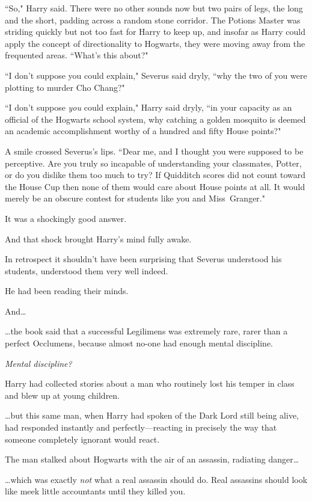 \later

``So," Harry said. There were no other sounds now but two pairs of legs, the long and the short, padding across a random stone corridor. The Potions Master was striding quickly but not too fast for Harry to keep up, and insofar as Harry could apply the concept of directionality to Hogwarts, they were moving away from the frequented areas. ``What's this about?"

``I don't suppose you could explain," Severus said dryly, ``why the two of you were plotting to murder Cho Chang?"

``I don't suppose \emph{you} could explain," Harry said dryly, ``in your capacity as an official of the Hogwarts school system, why catching a golden mosquito is deemed an academic accomplishment worthy of a hundred and fifty House points?"

A smile crossed Severus's lips. ``Dear me, and I thought you were supposed to be perceptive. Are you truly so incapable of understanding your classmates, Potter, or do you dislike them too much to try? If Quidditch scores did not count toward the House Cup then none of them would care about House points at all. It would merely be an obscure contest for students like you and Miss~Granger."

It was a shockingly good answer.

And that shock brought Harry's mind fully awake.

In retrospect it shouldn't have been surprising that Severus understood his students, understood them very well indeed.

He had been reading their minds.

And{\ldots}

{\ldots}the book said that a successful Legilimens was extremely rare, rarer than a perfect Occlumens, because almost no-one had enough mental discipline.

\emph{Mental discipline?}

Harry had collected stories about a man who routinely lost his temper in class and blew up at young children.

{\ldots}but this same man, when Harry had spoken of the Dark Lord still being alive, had responded instantly and perfectly—reacting in precisely the way that someone completely ignorant would react.

The man stalked about Hogwarts with the air of an assassin, radiating danger{\ldots}

{\ldots}which was exactly \emph{not} what a real assassin should do. Real assassins should look like meek little accountants until they killed you.

